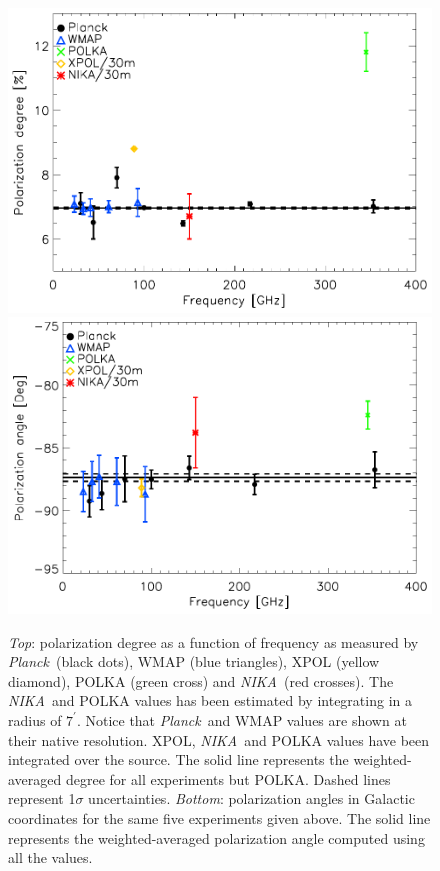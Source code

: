 \documentclass[twocolumn,traditabstract]{aa}
\def\NIKA{\textit{NIKA}}
\def\Planck{\textit{Planck}}
\begin{document}
\begin{figure}
  \centering
          { \includegraphics[width=1\linewidth,keepaspectratio]{figures/pdegree_comparison.pdf}}
          { \includegraphics[width=1\linewidth,keepaspectratio]{figures/angle_comparison.pdf}} 
            \caption{{\it Top}: polarization degree as a function of frequency as measured by \Planck\ (black dots), WMAP (blue triangles), XPOL (yellow diamond), POLKA (green cross) and \NIKA\ (red crosses). The \NIKA\ and POLKA values has been estimated by integrating in a radius of $7^{\prime}$. Notice that \Planck\ and WMAP values are shown at their native resolution. XPOL, \NIKA\ and POLKA values have been integrated over the source. The solid line represents the weighted-averaged degree for all experiments but POLKA. Dashed lines represent 1$\sigma$ uncertainties.
            {\it Bottom}: polarization angles in Galactic coordinates for the same five experiments given above. The solid line represents the weighted-averaged polarization angle computed using all the values.}
\label{crab_p_angle_comparison}		
  \end{figure}
\end{document}
